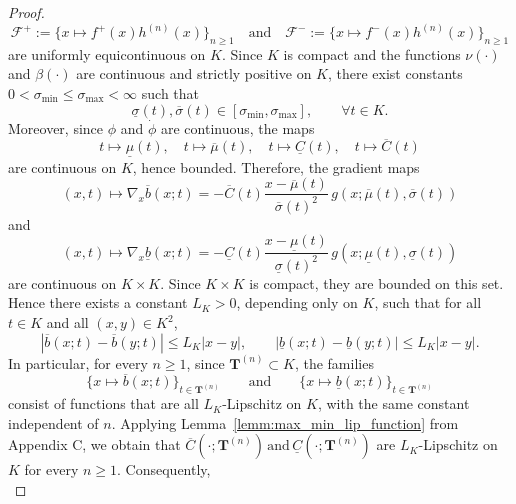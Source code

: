 \documentclass[review]{elsarticle}
\begin{document}
{\begin{proof}
$$
\mathcal F^+
:=
\{x\mapsto f^+(x)h^{(n)}(x)\}_{n\ge 1}
\quad\text{and}\quad
\mathcal F^-
:=
\{x\mapsto f^-(x)h^{(n)}(x)\}_{n\ge 1}
$$
are uniformly equicontinuous on $K$. Since $K$ is compact and the functions $\nu(\cdot)$ and $\beta(\cdot)$ are continuous and strictly positive on $K$, there exist constants $0<\sigma_{\min}\le \sigma_{\max}<\infty$ such that
\begin{equation}
\underline\sigma(t),\overline\sigma(t)\in [\sigma_{\min},\sigma_{\max}],
\qquad \forall t\in K.
\end{equation}
Moreover, since $\phi$ and $\dot\phi$ are continuous, the maps
\begin{equation}
t\mapsto \underline\mu(t),\quad
t\mapsto \overline\mu(t),\quad
t\mapsto \underline C(t),\quad
t\mapsto \overline C(t)
\end{equation}
are continuous on $K$, hence bounded. Therefore, the gradient maps
\begin{equation}
(x,t)\mapsto \nabla_x \overline b(x;t)
=
-\overline C(t)\frac{x-\overline\mu(t)}{\overline\sigma(t)^2}\,g(x;\overline\mu(t),\overline\sigma(t))
\end{equation}
and
\begin{equation}
(x,t)\mapsto \nabla_x \underline b(x;t)
=
-\underline C(t)\frac{x-\underline\mu(t)}{\underline\sigma(t)^2}\,g(x;\underline\mu(t),\underline\sigma(t))
\end{equation}
are continuous on $K\times K$. Since $K\times K$ is compact, they are bounded on this set. Hence there exists a constant $L_K>0$, depending only on $K$, such that for all $t\in K$ and all $(x,y)\in K^2$,
\begin{equation}
|\overline b(x;t)-\overline b(y;t)|\le L_K|x-y|,
\qquad
|\underline b(x;t)-\underline b(y;t)|\le L_K|x-y|.
\label{eq:Lip_b_thm2}
\end{equation}
In particular, for every $n\ge 1$, since $\mathbf T^{(n)}\subset K$, the families
\begin{equation}
\{x\mapsto \overline b(x;t)\}_{t\in \mathbf T^{(n)}}
\qquad\text{and}\qquad
\{x\mapsto \underline b(x;t)\}_{t\in \mathbf T^{(n)}}
\end{equation}
consist of functions that are all $L_K$-Lipschitz on $K$, with the same constant independent of $n$. Applying Lemma~\ref{lemm:max_min_lip_function} from Appendix C, we obtain that
$
\overline C(\cdot;\mathbf T^{(n)})
\,\text{and}\,
\underline C(\cdot;\mathbf T^{(n)})
$
are $L_K$-Lipschitz on $K$ for every $n\ge 1$. Consequently,
\begin{equation}

\end{equation}
\end{proof}}
\end{document}
